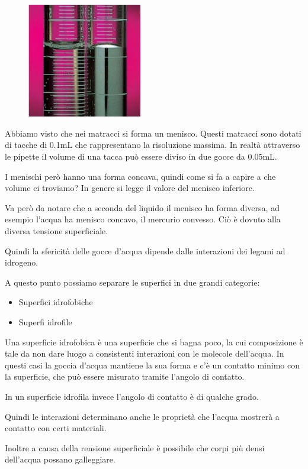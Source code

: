 \hspace{0.5cm}\begin{minipage}{0.35 \textwidth}
    \begin{figure}[H]
        \includegraphics[width=5cm]{immagini/menischi.png}
    \end{figure}
\end{minipage}
\begin{minipage}{0.6 \textwidth}
    \vspace{0.6cm}Abbiamo visto che nei matracci si forma un menisco.
    Questi matracci sono dotati di tacche di 0.1mL che rappresentano la risoluzione massima. In realtà attraverso le pipette il volume di una tacca può essere diviso in due gocce da 0.05mL.

    I menischi però hanno una forma concava, quindi come si fa a capire a che volume ci troviamo? In genere si legge il valore del menisco inferiore.

    Va però da notare che a seconda del liquido il menisco ha forma diversa, ad esempio l'acqua ha menisco concavo, il mercurio convesso. Ciò è dovuto alla diversa tensione superficiale.
\end{minipage}

\vspace{0.2cm}Quindi la sfericità delle gocce d'acqua dipende dalle interazioni dei legami ad idrogeno.

A questo punto possiamo separare le superfici in due grandi categorie:

\begin{itemize}
    \item Superfici idrofobiche
    \item Superfi idrofile
\end{itemize}

Una superficie idrofobica è una superficie che si bagna poco, la cui composizione è tale da non dare luogo a consistenti interazioni con le molecole dell'acqua. In questi casi la goccia d'acqua mantiene la sua forma e c'è un contatto minimo con la superficie, che può essere misurato tramite l'angolo di contatto.

In un superficie idrofila invece l'angolo di contatto è di qualche grado.

Quindi le interazioni determinano anche le proprietà che l'acqua mostrerà a contatto con certi materiali.

Inoltre a causa della rensione superficiale è possibile che corpi più densi dell'acqua possano galleggiare.